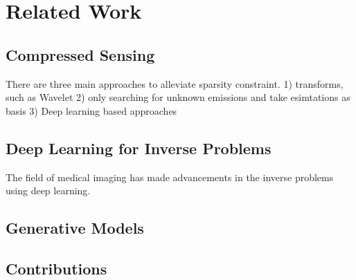 
\chapter{Related Work}\label{chapter:related_work}

\section{Compressed Sensing}
There are three main approaches to alleviate sparsity constraint.
1) transforms, such as Wavelet
2) only searching for unknown emissions and take esimtations as basis
3) Deep learning based approaches

\section{Deep Learning for Inverse Problems}
The field of medical imaging has made advancements in the inverse problems using deep learning.

\section{Generative Models}

\section{Contributions}
